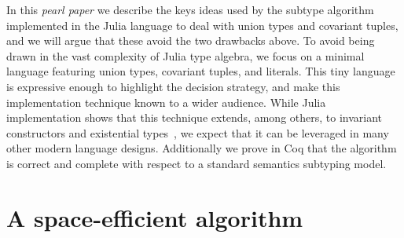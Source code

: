 \documentclass[a4paper,english]{lipics-v2018}
\begin{document}
In this \emph{pearl paper} we describe the keys ideas used by the
subtype algorithm implemented in the Julia language to deal with
union types and covariant tuples, and we will argue that these avoid the
two drawbacks above.  To avoid being drawn in the vast complexity of
Julia type algebra, we focus on a minimal language featuring union
types, covariant tuples, and literals.  This tiny language is
expressive enough to highlight the decision strategy, and make this
implementation technique known to a wider audience.  While Julia
implementation shows that this technique extends, among others, to
invariant constructors and existential
types~\cite{DBLP:journals/pacmpl/NardelliBPCBV18}, we expect that it
can be leveraged in many other modern language designs.  Additionally
we prove in Coq that the algorithm is correct and complete with
respect to a standard semantics subtyping model.


\section{A space-efficient algorithm}
\end{document}
